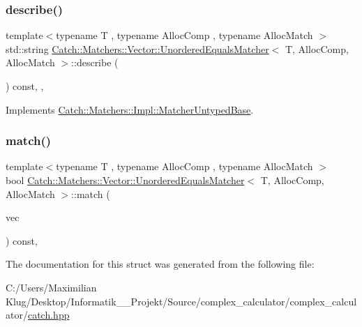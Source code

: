 \subsubsection{\texorpdfstring{describe()}{describe()}}
{\footnotesize\ttfamily template$<$typename T , typename Alloc\+Comp , typename Alloc\+Match $>$ \\
std\+::string \mbox{\hyperlink{struct_catch_1_1_matchers_1_1_vector_1_1_unordered_equals_matcher}{Catch\+::\+Matchers\+::\+Vector\+::\+Unordered\+Equals\+Matcher}}$<$ T, Alloc\+Comp, Alloc\+Match $>$\+::describe (\begin{DoxyParamCaption}{ }\end{DoxyParamCaption}) const\hspace{0.3cm}{\ttfamily [inline]}, {\ttfamily [override]}, {\ttfamily [virtual]}}



Implements \mbox{\hyperlink{class_catch_1_1_matchers_1_1_impl_1_1_matcher_untyped_base_a91d3a907dbfcbb596077df24f6e11fe2}{Catch\+::\+Matchers\+::\+Impl\+::\+Matcher\+Untyped\+Base}}.

\mbox{\label{struct_catch_1_1_matchers_1_1_vector_1_1_unordered_equals_matcher_abd5547585ba722cf3bb7aa3f9a8ffc0e}} 
\subsubsection{\texorpdfstring{match()}{match()}}
{\footnotesize\ttfamily template$<$typename T , typename Alloc\+Comp , typename Alloc\+Match $>$ \\
bool \mbox{\hyperlink{struct_catch_1_1_matchers_1_1_vector_1_1_unordered_equals_matcher}{Catch\+::\+Matchers\+::\+Vector\+::\+Unordered\+Equals\+Matcher}}$<$ T, Alloc\+Comp, Alloc\+Match $>$\+::match (\begin{DoxyParamCaption}\item[{std\+::vector$<$ T, Alloc\+Match $>$ const \&}]{vec }\end{DoxyParamCaption}) const\hspace{0.3cm}{\ttfamily [inline]}, {\ttfamily [override]}}



The documentation for this struct was generated from the following file\+:\begin{DoxyCompactItemize}
\item 
C\+:/\+Users/\+Maximilian Klug/\+Desktop/\+Informatik\+\_\+\_\+\+Projekt/\+Source/complex\+\_\+calculator/complex\+\_\+calculator/\mbox{\hyperlink{catch_8hpp}{catch.\+hpp}}\end{DoxyCompactItemize}
